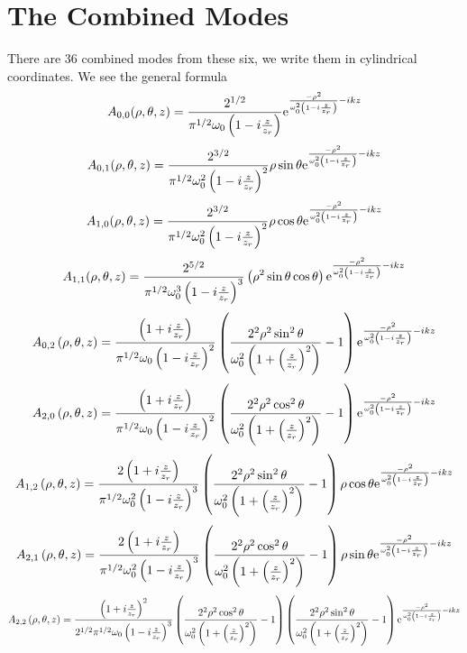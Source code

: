 \documentclass[11pt]{amsart}
\makeatletter
\newcommand{\e}{{\rm e}}				%
\newcommand{\0}{\varnothing}		%
\newcommand{\1}{!}
\newcommand{\2}{@}
\newcommand{\3}{\#}
\newcommand{\4}{\$}
\newcommand{\5}{\%}
\newcommand{\6}{$^\wedge$}
\newcommand{\7}{\&}
\newcommand{\8}{*}
\newcommand{\9}{(}
\makeatother
\begin{document}
\section{The Combined Modes}
There are 36 combined modes from these six, we write them in cylindrical coordinates.
We see the general formula
\[
A_{0,0}(\rho,\theta,z) = \frac{2^{1/2}}{\pi^{1/2}\omega_0\left(1-i\frac{z}{z_r}\right)}\e^{\frac{-\rho^2}{\omega_0^2\left(1-i\frac{z}{z_r}\right)}-ikz}
\]
\[
A_{0,1}(\rho, \theta, z) = \frac{2^{3/2}}{\pi^{1/2}\omega_0^2\left(1-i\frac{z}{z_r}\right)^2}\rho\sin\theta\e^{\frac{-\rho^2}{\omega_0^2\left(1-i\frac{z}{z_r}\right)}-ikz}
\]
\[
A_{1,0}(\rho, \theta, z) = \frac{2^{3/2}}{\pi^{1/2}\omega_0^2\left(1-i\frac{z}{z_r}\right)^2}\rho\cos\theta\e^{\frac{-\rho^2}{\omega_0^2\left(1-i\frac{z}{z_r}\right)}-ikz}
\]
\[
A_{1,1}(\rho, \theta, z) = \frac{2^{5/2}}{\pi^{1/2}\omega_0^3\left(1-i\frac{z}{z_r}\right)^3}\left(\rho^2\sin \theta \cos \theta\right)\e^{\frac{-\rho^2}{\omega_0^2\left(1-i\frac{z}{z_r}\right)}-ikz}
\]
\[
A_{0,2}\left(\rho,\theta,z\right) = \frac{\left(1+i\frac{z}{z_r}\right)}{\pi^{1/2}\omega_0\left(1-i\frac{z}{z_r}\right)^2}\left(\frac{2^2\rho^2\sin^2\theta}{\omega_0^2\left(1+\left(\frac{z}{z_r}\right)^2\right)}-1\right)\e^{\frac{-\rho^2}{\omega_0^2\left(1-i\frac{z}{z_r}\right)}-ikz}
\]
\[
A_{2,0}\left(\rho,\theta,z\right) = \frac{\left(1+i\frac{z}{z_r}\right)}{\pi^{1/2}\omega_0\left(1-i\frac{z}{z_r}\right)^2}\left(\frac{2^2\rho^2\cos^2\theta}{\omega_0^2\left(1+\left(\frac{z}{z_r}\right)^2\right)}-1\right)\e^{\frac{-\rho^2}{\omega_0^2\left(1-i\frac{z}{z_r}\right)}-ikz}
\]
\[
A_{1,2} \left(\rho,\theta,z\right) = \frac{2\left(1+i\frac{z}{z_r}\right)}{\pi^{1/2}\omega_0^2\left(1-i\frac{z}{z_r}\right)^3}\left(\frac{2^2\rho^2\sin^2\theta}{\omega_0^2\left(1+\left(\frac{z}{z_r}\right)^2\right)}-1\right)\rho\cos\theta \e^{\frac{-\rho^2}{\omega_0^2\left(1-i\frac{z}{z_r}\right)}-ikz}
\]
\[
A_{2,1} \left(\rho,\theta,z\right) = \frac{2\left(1+i\frac{z}{z_r}\right)}{\pi^{1/2}\omega_0^2\left(1-i\frac{z}{z_r}\right)^3}\left(\frac{2^2\rho^2\cos^2\theta}{\omega_0^2\left(1+\left(\frac{z}{z_r}\right)^2\right)}-1\right)\rho\sin\theta \e^{\frac{-\rho^2}{\omega_0^2\left(1-i\frac{z}{z_r}\right)}-ikz}
\]
\[
A_{2,2}\left(\rho,\theta,z\right) = \frac{\left(1+i\frac{z}{z_r}\right)^2}{2^{1/2}\pi^{1/2}\omega_0\left(1-i\frac{z}{z_r}\right)^3}\left(\frac{2^2\rho^2\cos^2\theta}{\omega_0^2\left(1+\left(\frac{z}{z_r}\right)^2\right)}-1\right)\left(\frac{2^2\rho^2\sin^2\theta}{\omega_0^2\left(1+\left(\frac{z}{z_r}\right)^2\right)}-1\right) \e^{\frac{-\rho^2}{\omega_0^2\left(1-i\frac{z}{z_r}\right)}-ikz}
\]
\end{document}
